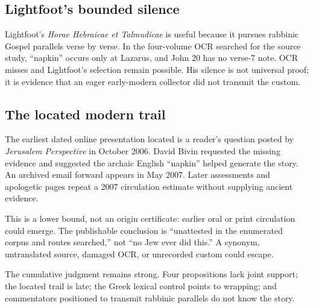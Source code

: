 \subsection{Lightfoot's bounded silence}

Lightfoot's \emph{Horae Hebraicae et Talmudicae} is useful because it pursues
rabbinic Gospel parallels verse by verse. In the four-volume OCR searched for
the source study, ``napkin'' occurs only at Lazarus, and John 20 has no verse-7
note. OCR misses and Lightfoot's selection remain possible. His silence is not
universal proof; it is evidence that an eager early-modern collector did not
transmit the custom.

\subsection{The located modern trail}

The earliest dated online presentation located is a reader's question posted
by \emph{Jerusalem Perspective} in October 2006. David Bivin requested the
missing evidence and suggested the archaic English ``napkin'' helped generate
the story. An archived email forward appears in May 2007. Later assessments and
apologetic pages repeat a 2007 circulation estimate without supplying ancient
evidence.

This is a lower bound, not an origin certificate: earlier oral or print
circulation could emerge. The publishable conclusion is ``unattested in the
enumerated corpus and routes searched,'' not ``no Jew ever did this.'' A
synonym, untranslated source, damaged OCR, or unrecorded custom could escape.

The cumulative judgment remains strong. Four propositions lack joint support;
the located trail is late; the Greek lexical control points to wrapping; and
commentators positioned to transmit rabbinic parallels do not know the story.

